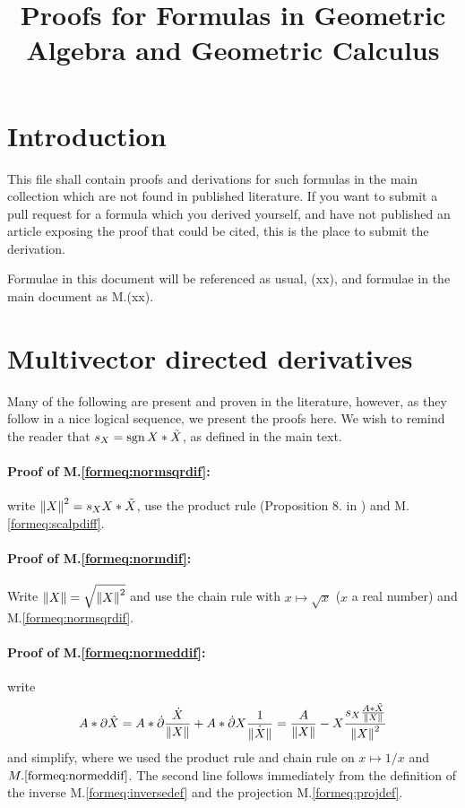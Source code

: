\documentclass[a4paper,12pt]{article}
\title{Proofs for Formulas in Geometric Algebra and Geometric Calculus}
\author{}
\newcommand{\meqref}[1]{M.\eqref{form#1}}
\theoremstyle{definition}
\begin{document}
\maketitle

\section{Introduction}

This file shall contain proofs and derivations for such formulas in the main collection which are not found in published literature. If you want to submit a pull request for a formula which you derived yourself, and have not published an article exposing the proof that could be cited, this is the place to submit the derivation.

Formulae in this document will be referenced as usual, (xx), and formulae in the main document as M.(xx).
\section{Multivector directed derivatives}

Many of the following are present and proven in the literature, however, as they follow in a nice logical sequence, we present the proofs here.
We wish to remind the reader that $s_{X} = \operatorname{sgn}{X * \tilde{X}}$, as defined in the main text.

\paragraph{Proof of \meqref{eq:normsqrdif}:} write $\left\lVert X\right\rVert^2 = s_{X} X * \tilde{X}$, use the product rule (Proposition 8. in \cite{HitzerCalculus}) and \meqref{eq:scalpdiff}.

\paragraph{Proof of \meqref{eq:normdif}:} Write $\left\lVert X\right\rVert = \sqrt{\left\lVert X\right\rVert^2}$ and use the chain rule with $x \mapsto \sqrt{x}$ ($x$ a real number) and \meqref{eq:normsqrdif}.

\paragraph{Proof of \meqref{eq:normeddif}:} write
\begin{equation}
A*\partial \hat{X} = A*\dot{\partial} \frac{\dot{X}}{\left\lVert X\right\rVert} + A*\dot{\partial} X \frac{1}{\dot{\left\lVert X\right\rVert}} = \frac{A}{\left\lVert X\right\rVert} - X \frac{s_{X} \frac{A * \tilde{X}}{\left\lVert X\right\rVert}}{\left\lVert X\right\rVert^2}
\end{equation}
and simplify, where we used the product rule and chain rule on $x \mapsto 1/x$ and $\meqref{eq:normeddif}$.
The second line follows immediately from the definition of the inverse \meqref{eq:inversedef} and the projection \meqref{eq:projdef}.
\end{document}
